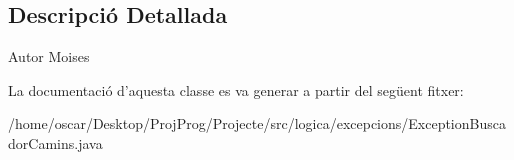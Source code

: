 \subsection{Descripció Detallada}
\begin{DoxyAuthor}{Autor}
Moises 
\end{DoxyAuthor}


La documentació d'aquesta classe es va generar a partir del següent fitxer\+:\begin{DoxyCompactItemize}
\item 
/home/oscar/\+Desktop/\+Proj\+Prog/\+Projecte/src/logica/excepcions/Exception\+Buscador\+Camins.\+java\end{DoxyCompactItemize}
